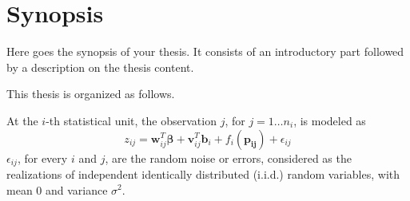 
\chapter{Synopsis}
\label{ch:synopsis}

Here goes the synopsis of your thesis. It consists of an introductory part followed by a description on the thesis content. 

This thesis is organized as follows.

At the $i$-th statistical unit, the observation $j$, for $j = 1 \dots n_i$, is modeled as
\begin{equation}
    \label{model}
    z_{ij} = \bm{w}_{ij}^T \bm{\beta} + \bm{v}_{ij}^T \bm{b}_i + f_i(\bm{p_{ij}}) + \epsilon_{ij}
\end{equation}
$\epsilon_{ij}$, for every $i$ and $j$, are the random noise or errors, considered as the realizations of independent identically distributed (i.i.d.) random variables, with mean $0$ and variance $\sigma^2$. 